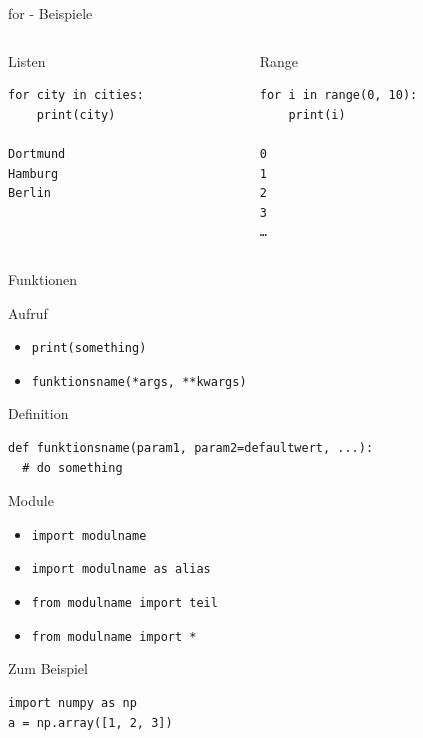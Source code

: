 \begin{frame}[fragile]{for - Beispiele}
\vspace{-1em}
\begin{spacing}{1.0}
\begin{columns}
    \begin{column}{0.4\paperwidth}
      \begin{exampleblock}{Listen}
        \begin{verbatim}
for city in cities:
    print(city)
    
Dortmund
Hamburg
Berlin
        \end{verbatim}
      \end{exampleblock}
    \end{column}
    \begin{column}{.4\paperwidth}
      \begin{exampleblock}{Range}
        \begin{verbatim}
for i in range(0, 10):
    print(i)
    
0
1
2
3
…
        \end{verbatim}
      \end{exampleblock}
    \end{column}
  \end{columns}
\end{spacing}
\end{frame}

\begin{frame}[fragile]{Funktionen}
  \begin{block}{Aufruf}
    \begin{itemize}
      \item \texttt{print(something)}
      \item \texttt{funktionsname(*args, **kwargs)}
    \end{itemize}
  \end{block}
  \begin{block}{Definition}
    \begin{verbatim}
def funktionsname(param1, param2=defaultwert, ...):
  # do something
    \end{verbatim}
  \end{block}
\end{frame}

\begin{frame}[fragile]{Module}
  \begin{itemize}
    \item \texttt{import modulname}
    \item \texttt{import modulname as alias}
    \item \texttt{from modulname import teil}
    \item \texttt{from modulname import *}
  \end{itemize}
  \begin{exampleblock}{Zum Beispiel}
    \begin{verbatim}
import numpy as np
a = np.array([1, 2, 3])
    \end{verbatim}
  \end{exampleblock}
\end{frame}

